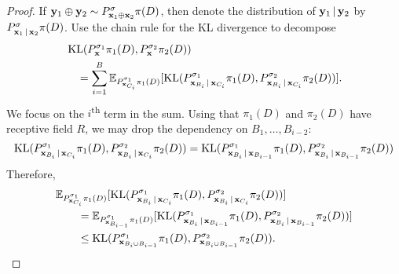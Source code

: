 \documentclass[12pt, twoside]{report}
\begin{document}
\begin{proof}
    If $\mathbf{y}_1 \oplus \mathbf{y}_2 \sim P^\sigma_{\mathbf{x}_1 \oplus \mathbf{x}_2} \pi(D)$, then denote the distribution of $\mathbf{y}_1 \,|\, \mathbf{y}_2$ by $P^{\sigma}_{\mathbf{x}_1 \,|\, \mathbf{x}_2} \pi(D)$.
    Use the chain rule for the KL divergence to decompose
    \begin{align}
        &\operatorname{KL}(P^{\sigma_1}_{\mathbf{x}} \pi_1(D), P^{\sigma_2}_{\mathbf{x}} \pi_2(D)) \nonumber \\
        &\quad= \sum_{i=1}^B
        \mathbb{E}_{P_{\mathbf{x}_{C_i}}^{\sigma_1} \pi_1(D)}[
                \operatorname{KL}(
                    P_{\mathbf{x}_{B_i} \,|\, \mathbf{x}_{C_i}}^{\sigma_1} \pi_1(D),
                    P_{\mathbf{x}_{B_i} \,|\, \mathbf{x}_{C_i}}^{\sigma_2} \pi_2(D)
                )
            ].
    \end{align}
    We focus on the $i$\textsuperscript{th} term in the sum.
    Using that $\pi_1(D)$ and $\pi_2(D)$ have receptive field $R$, we may drop the dependency on $B_1, \ldots, B_{i-2}$:
    \begin{align}
        \operatorname{KL}(
            P_{\mathbf{x}_{B_i} \,|\, \mathbf{x}_{C_i}}^{\sigma_1} \pi_1(D),
            P_{\mathbf{x}_{B_i} \,|\, \mathbf{x}_{C_i}}^{\sigma_2} \pi_2(D)
        )
        = \operatorname{KL}(
            P_{\mathbf{x}_{B_i} \,|\, \mathbf{x}_{B_{i-1}}}^{\sigma_1} \pi_1(D),
            P_{\mathbf{x}_{B_i} \,|\, \mathbf{x}_{B_{i-1}}}^{\sigma_2} \pi_2(D)
        )
    \end{align}
    Therefore,
    \begin{align}
        &\E_{P^{\sigma_1}_{\vx_{C_i}} \pi_1(D)}[ \KL(
            P_{\vx_{B_i} \cond \vx_{C_i}}^{\sigma_1} \pi_1(D),
            P_{\vx_{B_i} \cond \vx_{C_i}}^{\sigma_2} \pi_2(D)
        )] \nonumber \\
        &\qquad= \E_{P^{\sigma_1}_{\vx_{B_{i-1}}}\pi_1(D)}[\KL(
            P_{\vx_{B_i} \cond \vx_{B_{i-1}}}^{\sigma_1} \pi_1(D),
            P_{\vx_{B_i} \cond \vx_{B_{i-1}}}^{\sigma_2} \pi_2(D)
            )] \\
        &\qquad\le \KL(
            P_{\vx_{B_i \cup B_{i-1}}}^{\sigma_1} \pi_1(D),
            P_{\vx_{B_i \cup B_{i-1}}}^{\sigma_2} \pi_2(D)
            ).

\end{align}
\end{proof}
\end{document}
